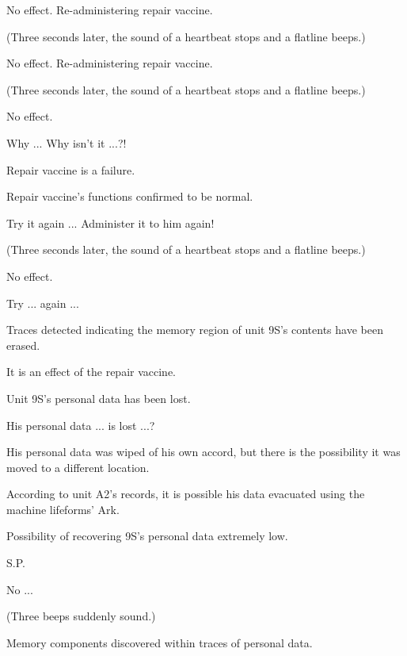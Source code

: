 \begin{play}
	  No effect. Re-administering repair vaccine.
	
	(Three seconds later, the sound of a heartbeat stops and a flatline beeps.)
	
	  No effect. Re-administering repair vaccine.
	
	(Three seconds later, the sound of a heartbeat stops and a flatline beeps.)
	
	  No effect.
	
	  Why ... Why isn't it ...?!
	
	  Repair vaccine is a failure.
	
	  Repair vaccine's functions confirmed to be normal.
	
	  Try it again ... Administer it to him again!
	
	(Three seconds later, the sound of a heartbeat stops and a flatline beeps.)
	
	  No effect.
	
	  Try ... again ...
	
	  Traces detected indicating the memory region of unit 9S's contents have been erased.
	
	  It is an effect of the repair vaccine.
	
	  Unit 9S's personal data has been lost.
	
	  His personal data ... is lost ...?
	
	  His personal data was wiped of his own accord, but there is the possibility it was moved to a different location.
	
	  According to unit A2's records, it is possible his data evacuated using the machine lifeforms' Ark.
	
	  Possibility of recovering 9S's personal data extremely low.
	
	S.P.
	
	  No ...
	
	(Three beeps suddenly sound.)
	
	  Memory components discovered within traces of personal data.
	

\end{play}
